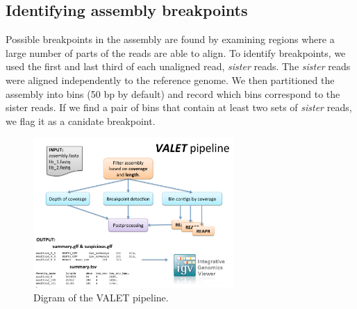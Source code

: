 \documentclass{bioinfo}
\begin{document}
\subsection{Identifying assembly breakpoints}

Possible breakpoints in the assembly are found by examining regions where a large number of parts of the reads are able to align.
To identify breakpoints, we used the first and last third of each unaligned read, \emph{sister} reads.
The \emph{sister} reads were aligned independently to the reference genome.
We then partitioned the assembly into bins (50 bp by default) and record which bins correspond to the sister reads.
If we find a pair of bins that contain at least two sets of \textit{sister} reads, we flag it as a canidate breakpoint.

\begin{figure}[tb!]
\begin{center}
\includegraphics[width=3in]{figures/valet_pipeline}
\end{center}
\caption[valet_pipeline]{Digram of the VALET pipeline.}
\label{fig:valet_pipeline}
\end{figure}
\end{document}
